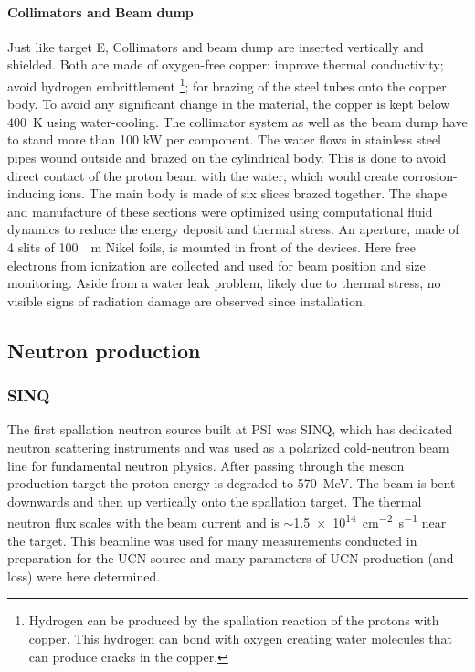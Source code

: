 \begin{refsection}
        \paragraph{Collimators and Beam dump}
        Just like target E, Collimators and beam dump are inserted vertically and shielded.
        Both are made of oxygen-free copper: improve thermal conductivity; avoid hydrogen embrittlement \footnote{Hydrogen can be produced by the spallation reaction of the protons with copper. This hydrogen can bond with oxygen creating water molecules that can produce cracks in the copper.}; for brazing of the steel tubes onto the copper body.
        To avoid any significant change in the material, the copper is kept below \SI{400}{K} using water-cooling.
        The collimator system as well as the beam dump have to stand more than 100 kW per component.
        The water flows in stainless steel pipes wound outside and brazed on the cylindrical body. 
        This is done to avoid direct contact of the proton beam with the water, which would create corrosion-inducing ions.
        The main body is made of six slices brazed together.
        The shape and manufacture of these sections were optimized using computational fluid dynamics to reduce the energy deposit and thermal stress.
        An aperture, made of 4 slits of \SI{100}{\mu m} Nikel foils, is mounted in front of the devices.
        Here free electrons from ionization are collected and used for beam position and size monitoring.
        Aside from a water leak problem, likely due to thermal stress, no visible signs of radiation damage are observed since installation.
        
    \subsection{Neutron production}
        \label{sec:nproduction}
        \subsubsection{SINQ}
            The first spallation neutron source built at PSI was SINQ, which has dedicated neutron scattering instruments and was used as a polarized cold-neutron beam line for fundamental neutron physics.
            After passing through the meson production target the proton energy is degraded to \SI{570}{MeV}. 
            The beam is bent downwards and then up vertically onto the spallation target.
            The thermal neutron flux scales with the beam current and is $\sim$\SI{1.5e14}{cm^{-2}s^{-1}} near the target.
            This beamline was used for many measurements conducted in preparation for the UCN source and many parameters of UCN production (and loss) were here determined.
            

\end{refsection}
